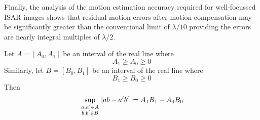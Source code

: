 Finally, the analysis of the motion estimation accuracy required for well-focussed ISAR
images shows that residual motion errors after motion compensation may
be significantly greater than the conventional limit of $\lambda/10$
providing the errors are nearly integral multiples of $\lambda/2$.

\label{rmc app:lemma}

\begin{lemma}
\label{rmc thm:lemma}
Let $A=[A_0,A_1]$ be an interval of the real line where 
\begin{equation}
A_1\geq A_0\geq 0
\end{equation}
Similarly, let $B=[B_0,B_1]$ be an interval of the real line where
\begin{equation}
B_1\geq B_0\geq 0
\end{equation}
Then
\begin{equation}
\sup_{\scriptstyle a,a'\in A\atop\scriptstyle b,b'\in B}
\left|ab-a'b'\right|=A_1B_1-A_0B_0
\end{equation}
\end{lemma}

